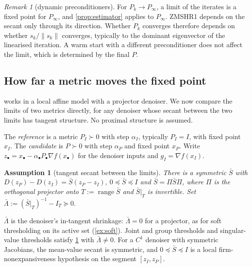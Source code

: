 \documentclass[11pt]{article}
\newtheorem{assumption}[theorem]{Assumption}
\theoremstyle{definition}
\theoremstyle{remark}
\newtheorem{remark}[theorem]{Remark}
\newcommand{\norm}[1]{\lVert #1\rVert}
\newcommand{\range}{\operatorname{range}}
\begin{document}
\begin{remark}[dynamic preconditioners]
For $P_k\to P_\infty$, a limit of the iterates is a fixed point for $P_\infty$, and \cref{prop:estimator} applies to
$P_\infty$. ZMSHR1 depends on the secant only through its direction. Whether $P_k$ converges therefore depends on
whether $s_k/\norm{s_k}$ converges, typically to the dominant eigenvector of the linearised iteration. A warm start
with a different preconditioner does not affect the limit, which is determined by the final $P$.
\end{remark}

\subsection{How far a metric moves the fixed point}\label{sec:displacement}

 works in a local affine model with a projector denoiser. We now compare the limits of two
metrics directly, for any denoiser whose secant between the two limits has tangent structure. No proximal
structure is assumed.

The \emph{reference} is a metric $P_I\succ0$ with step $\alpha_I$, typically $P_I=I$, with fixed point $x_I$. The
\emph{candidate} is $P\succ0$ with step $\alpha_P$ and fixed point $x_P$. Write $z_\bullet=x_\bullet-\alpha_\bullet P_\bullet\nabla f(x_\bullet)$
for the denoiser inputs and $g_I=\nabla f(x_I)$.

\begin{assumption}[tangent secant between the limits]\label{ass:fpsecant}
There is a symmetric $\bar S$ with $D(z_P)-D(z_I)=\bar S(z_P-z_I)$, $0\preceq\bar S\preceq I$ and $\bar S=\Pi\bar S\Pi$,
where $\Pi$ is the orthogonal projector onto $T:=\range\bar S$ and $\bar S|_T$ is invertible. Set
$\bar\Lambda:=(\bar S|_T)^{-1}-I_T\succeq0$.
\end{assumption}

$\bar\Lambda$ is the denoiser's in-tangent shrinkage: $\bar\Lambda=0$ for a projector, as for soft thresholding on its
active set (\cref{ex:soft}). Joint and group thresholds and singular-value thresholds satisfy
\cref{ass:fpsecant} with $\bar\Lambda\neq0$. For a $C^1$ denoiser with symmetric Jacobians, the mean-value secant
is symmetric, and $0\preceq\bar S\preceq I$ is a local firm-nonexpansiveness hypothesis on the segment
$[z_I,z_P]$.
\end{document}
